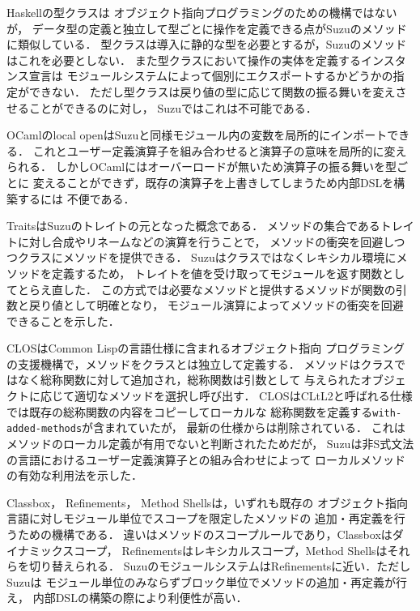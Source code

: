 \documentclass[a4paper,11pt,dvipdfmx]{jreport}
\begin{document}
Haskellの型クラス\cite{Wadler:1989:MAP:75277.75283}は
オブジェクト指向プログラミングのための機構ではないが，
データ型の定義と独立して型ごとに操作を定義できる点がSuzuのメソッドに類似している．
型クラスは導入に静的な型を必要とするが，Suzuのメソッドはこれを必要としない．
また型クラスにおいて操作の実体を定義するインスタンス宣言は
モジュールシステムによって個別にエクスポートするかどうかの指定ができない．
ただし型クラスは戻り値の型に応じて関数の振る舞いを変えさせることができるのに対し，
Suzuではこれは不可能である．

OCamlのlocal openはSuzuと同様モジュール内の変数を局所的にインポートできる．
これとユーザー定義演算子を組み合わせると演算子の意味を局所的に変えられる．
しかしOCamlにはオーバーロードが無いため演算子の振る舞いを型ごとに
変えることができず，既存の演算子を上書きしてしまうため内部DSLを構築するには
不便である．

Traits\cite{Scharli:2003}はSuzuのトレイトの元となった概念である．
メソッドの集合であるトレイトに対し合成やリネームなどの演算を行うことで，
メソッドの衝突を回避しつつクラスにメソッドを提供できる．
Suzuはクラスではなくレキシカル環境にメソッドを定義するため，
トレイトを値を受け取ってモジュールを返す関数としてとらえ直した．
この方式では必要なメソッドと提供するメソッドが関数の引数と戻り値として明確となり，
モジュール演算によってメソッドの衝突を回避できることを示した．

CLOS\cite{Ida:2010}はCommon Lispの言語仕様に含まれるオブジェクト指向
プログラミングの支援機構で，メソッドをクラスとは独立して定義する．
メソッドはクラスではなく総称関数に対して追加され，総称関数は引数として
与えられたオブジェクトに応じて適切なメソッドを選択し呼び出す．
CLOSはCLtL2と呼ばれる仕様では既存の総称関数の内容をコピーしてローカルな
総称関数を定義する\verb|with-added-methods|が含まれていたが，
最新の仕様からは削除されている．
これはメソッドのローカル定義が有用でないと判断されたためだが，
Suzuは非S式文法の言語におけるユーザー定義演算子との組み合わせによって
ローカルメソッドの有効な利用法を示した．

Classbox\cite{Bergel:2005:CCV:1646591.1646599}，
Refinements\cite{Maeda:2013}，
Method Shells\cite{Takeshita:2014-07-14}は，いずれも既存の
オブジェクト指向言語に対しモジュール単位でスコープを限定したメソッドの
追加・再定義を行うための機構である．
違いはメソッドのスコープルールであり，Classboxはダイナミックスコープ，
Refinementsはレキシカルスコープ，Method Shellsはそれらを切り替えられる．
SuzuのモジュールシステムはRefinementsに近い．ただしSuzuは
モジュール単位のみならずブロック単位でメソッドの追加・再定義が行え，
内部DSLの構築の際により利便性が高い．
\end{document}
